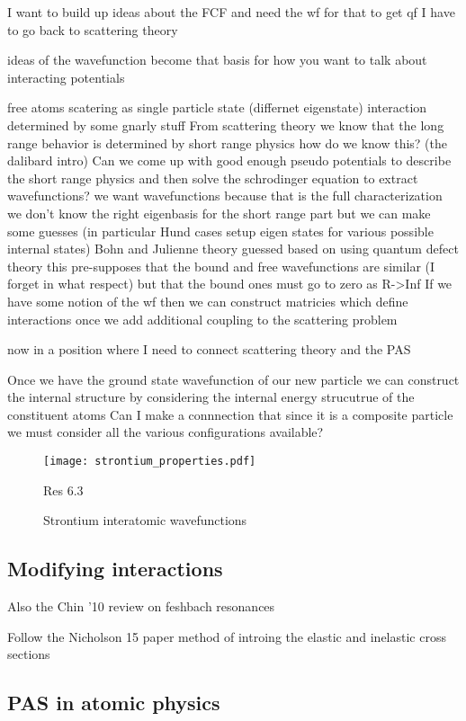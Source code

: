 I want to build up ideas about the FCF and need the wf for that
	to get qf I have to go back to scattering theory

ideas of the wavefunction become that basis for how you want to talk about interacting potentials


free atoms
scatering as single particle state (differnet eigenstate)
	interaction determined by some gnarly stuff
From scattering theory we know that the long range behavior is determined by short range physics
	how do we know this? (the dalibard intro)
Can we come up with good enough pseudo potentials to describe the short range physics and then solve the schrodinger equation to extract wavefunctions?
	we want wavefunctions because that is the full characterization
	we don't know the right eigenbasis for the short range part but we can make some guesses (in particular Hund cases setup eigen states for various possible internal states)
	Bohn and Julienne theory guessed based on using quantum defect theory
		this pre-supposes that the bound and free wavefunctions are similar (I forget in what respect) but that the bound ones must go to zero as R->Inf
If we have some notion of the wf then we can construct matricies which define interactions once we add additional coupling to the scattering problem


now in a position where I need to connect scattering theory and the PAS


Once we have the ground state wavefunction of our new particle we can construct the internal structure by considering the internal energy strucutrue of the constituent atoms
	Can I make a connnection that since it is a composite particle we must consider all the various configurations available?
	
\begin{figure} \label{fig:sr_scat_wf}
	\centerline{
	\texttt{[image: strontium\_properties.pdf]}}
	\caption{Strontium interatomic wavefunctions}{Res 6.3}
\end{figure} 

\subsection{Modifying interactions}
\label{ssec:mod_int}

Also the Chin '10 review on feshbach resonances

Follow the Nicholson 15 paper method of introing the elastic and inelastic cross sections


\subsection{PAS in atomic physics}
\label{ssec:pas_amo}

